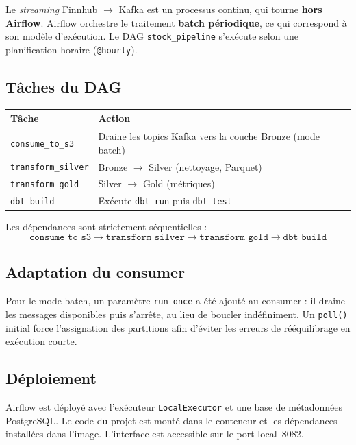 \documentclass[11pt,a4paper]{article}
\newcommand{\code}[1]{\texttt{\small #1}}
\begin{document}
Le \emph{streaming} Finnhub $\rightarrow$ Kafka est un processus continu, qui
tourne \textbf{hors Airflow}. Airflow orchestre le traitement \textbf{batch
périodique}, ce qui correspond à son modèle d'exécution. Le DAG
\code{stock\_pipeline} s'exécute selon une planification horaire
(\code{@hourly}).

\subsection{Tâches du DAG}

\begin{center}
\renewcommand{\arraystretch}{1.25}
\begin{tabularx}{\linewidth}{@{}lX@{}}
\toprule
\textbf{Tâche} & \textbf{Action} \\
\midrule
\code{consume\_to\_s3}   & Draine les topics Kafka vers la couche Bronze (mode batch) \\
\code{transform\_silver} & Bronze $\rightarrow$ Silver (nettoyage, Parquet) \\
\code{transform\_gold}   & Silver $\rightarrow$ Gold (métriques) \\
\code{dbt\_build}        & Exécute \code{dbt run} puis \code{dbt test} \\
\bottomrule
\end{tabularx}
\end{center}

Les dépendances sont strictement séquentielles :
\[
\texttt{consume\_to\_s3} \rightarrow \texttt{transform\_silver}
\rightarrow \texttt{transform\_gold} \rightarrow \texttt{dbt\_build}
\]

\subsection{Adaptation du consumer}

Pour le mode batch, un paramètre \code{run\_once} a été ajouté au consumer : il
draine les messages disponibles puis s'arrête, au lieu de boucler
indéfiniment. Un \code{poll()} initial force l'assignation des partitions afin
d'éviter les erreurs de rééquilibrage en exécution courte.

\subsection{Déploiement}

Airflow est déployé avec l'exécuteur \code{LocalExecutor} et une base de
métadonnées PostgreSQL. Le code du projet est monté dans le conteneur et les
dépendances installées dans l'image. L'interface est accessible sur le port
local~8082.
\end{document}
